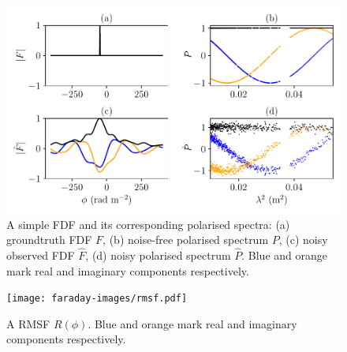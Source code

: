   \begin{figure}
    \includegraphics[width=\linewidth]{faraday-images/spectra_simple.pdf}
    \caption{A simple FDF and its corresponding polarised spectra: (a) groundtruth FDF $F$, (b) noise-free polarised spectrum $P$, (c) noisy observed FDF $\hat F$, (d) noisy polarised spectrum $\hat P$. Blue and orange mark real and imaginary components respectively.}
  \end{figure}

  \begin{figure}
    \texttt{[image: faraday-images/rmsf.pdf]}
    \caption{A RMSF $R(\phi)$. Blue and orange mark real and imaginary components respectively.}
    \label{fig:faraday-rmsf}
  \end{figure}

